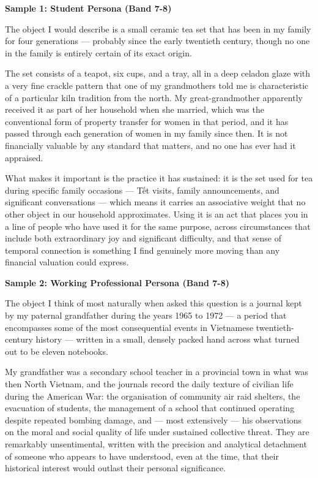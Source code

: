 \begin{ieltsanswer}
\textbf{Sample 1: Student Persona (Band 7-8)}

The object I would describe is a small ceramic tea set that has been in my family for four generations — probably since the early twentieth century, though no one in the family is entirely certain of its exact origin.

The set consists of a teapot, six cups, and a tray, all in a deep celadon glaze with a very fine crackle pattern that one of my grandmothers told me is characteristic of a particular kiln tradition from the north. My great-grandmother apparently received it as part of her household when she married, which was the conventional form of property transfer for women in that period, and it has passed through each generation of women in my family since then. It is not financially valuable by any standard that matters, and no one has ever had it appraised.

What makes it important is the practice it has sustained: it is the set used for tea during specific family occasions — Tết visits, family announcements, and significant conversations — which means it carries an associative weight that no other object in our household approximates. Using it is an act that places you in a line of people who have used it for the same purpose, across circumstances that include both extraordinary joy and significant difficulty, and that sense of temporal connection is something I find genuinely more moving than any financial valuation could express.

\textbf{Sample 2: Working Professional Persona (Band 7-8)}

The object I think of most naturally when asked this question is a journal kept by my paternal grandfather during the years 1965 to 1972 — a period that encompasses some of the most consequential events in Vietnamese twentieth-century history — written in a small, densely packed hand across what turned out to be eleven notebooks.

My grandfather was a secondary school teacher in a provincial town in what was then North Vietnam, and the journals record the daily texture of civilian life during the American War: the organisation of community air raid shelters, the evacuation of students, the management of a school that continued operating despite repeated bombing damage, and — most extensively — his observations on the moral and social quality of life under sustained collective threat. They are remarkably unsentimental, written with the precision and analytical detachment of someone who appears to have understood, even at the time, that their historical interest would outlast their personal significance.


\end{ieltsanswer}

